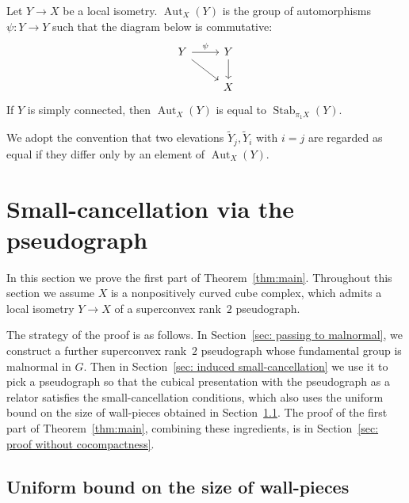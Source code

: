 \documentclass[12pt,oneside]{amsart}
\theoremstyle{definition}
\theoremstyle{definition}
\theoremstyle{remark}
\DeclareMathOperator{\Aut}{Aut}
\DeclareMathOperator{\Stab}{Stab}
\begin{document}
Let $Y \rightarrow X$ be a local isometry. $\Aut_X(Y)$ is the group of automorphisms $\psi: Y \rightarrow Y$ such that the diagram below is commutative:
\[\begin{tikzcd}
Y \arrow[r, "\psi"] \arrow[rd] & Y \arrow[d] \\
                               & X          
\end{tikzcd}\]
If $Y$ is simply connected, then $\Aut_X(Y)$ is equal to $\Stab_{\pi_1X}(Y)$.

We adopt the convention that two elevations $\widetilde{Y}_j, \widetilde{Y}_i$ with $i=j$ are regarded as equal if they differ only by an element of $\Aut_X(Y)$.






\section{Small-cancellation via the pseudograph}\label{sec: small cancellation via pseudograph}

In this section we  prove the first part of Theorem~\ref{thm:main}.
%
Throughout this section we assume  $X$ is a 
nonpositively curved cube complex, which admits a local isometry $Y\to X$ of a superconvex rank~$2$ pseudograph.

The strategy of the proof is as follows. In Section~\ref{sec: passing to malnormal}, we construct a further superconvex rank~$2$ pseudograph whose fundamental group is malnormal in $G$. Then in Section~\ref{sec: induced small-cancellation} we use it to pick a pseudograph so that the cubical presentation with the pseudograph as a relator satisfies the small-cancellation conditions, which also uses the uniform bound on the size of wall-pieces obtained in Section~\ref{sec: uniform bound}. The proof of the first part of Theorem~\ref{thm:main}, combining these ingredients, is in Section~\ref{sec: proof without cocompactness}.


\subsection{Uniform bound on the size of wall-pieces}\label{sec: uniform bound}
\end{document}
